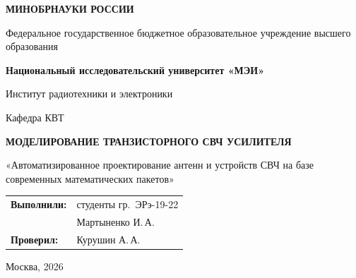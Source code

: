 \begin{titlepage}
    \centering
    {\bfseries МИНОБРНАУКИ РОССИИ\par}
    Федеральное государственное бюджетное образовательное учреждение высшего образования \\
    {\bfseries Национальный исследовательский университет «МЭИ»\par}
    \vspace{1cm}
    Институт радиотехники и электроники\par
    Кафедра КВТ\par
    \vspace{3cm}
    
    {\bfseries\large МОДЕЛИРОВАНИЕ ТРАНЗИСТОРНОГО СВЧ УСИЛИТЕЛЯ\par} \vspace{0.5cm}
    {\large «Автоматизированное проектирование антенн и устройств СВЧ на базе современных математических пакетов»\par}
    
    \vspace{3.5cm}
 \vspace{1.5cm}
\noindent\hfill
\begin{tabular}{@{}ll@{}}
    \textbf{Выполнили:} & студенты гр.~ЭРэ-19-22 \\
                        & Мартыненко И.\,А. \\
    \textbf{Проверил:}  & Курушин А.\,А.
\end{tabular}   
    \vfill
    {Москва, 2026}
\end{titlepage}
